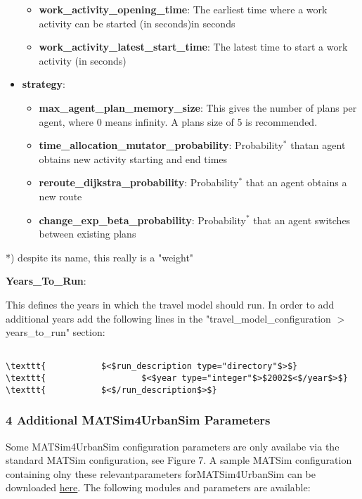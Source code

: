 \begin{itemize}
\begin{itemize}
	\item \textbf{work\_activity\_opening\_time}: The earliest time where a work activity can be started (in seconds)in seconds
	\item \textbf{work\_activity\_latest\_start\_time}: The latest time to start a work activity (in seconds)
\end{itemize}
	\item \textbf{strategy}:   
\begin{itemize}
	\item \textbf{max\_agent\_plan\_memory\_size}: This gives the number of plans per agent, where 0 means infinity. A plans size of 5 is recommended.
	\item \textbf{time\_allocation\_mutator\_probability}: Probability$^*$ thatan agent obtains new activity starting and end times
	\item \textbf{reroute\_dijkstra\_probability}: Probability$^*$ that an agent obtains a new route
	\item \textbf{change\_exp\_beta}\textbf{\_probability}: Probability$^*$ that an agent switches between existing plans
\end{itemize}
\end{itemize}

*) despite its name, this really is a "weight"

\textbf{Years\_To\_Run}:

This defines the years in which the travel model should run. In order  to add additional years add the following lines in the  "travel\_model\_configuration $>$ years\_to\_run" section:
\begin{verbatim}

\texttt{           $<$run_description type="directory"$>$}
\texttt{                   $<$year type="integer"$>$2002$<$/year$>$}
\texttt{           $<$/run_description$>$}
\end{verbatim}

\subsubsection{4 Additional MATSim4UrbanSim Parameters}

Some MATSim4UrbanSim configuration parameters are only availabe via the standard MATSim configuration, see Figure 7. A sample MATSim configuration containing olny these relevantparameters forMATSim4UrbanSim can be downloaded \href{https://svn.vsp.tu-berlin.de/repos/public-svn/matsim/examples/countries/us/seattle/external_matsim_config_with_matsim4urbansim_settings.xml}{here}. The following modules and parameters are available:

